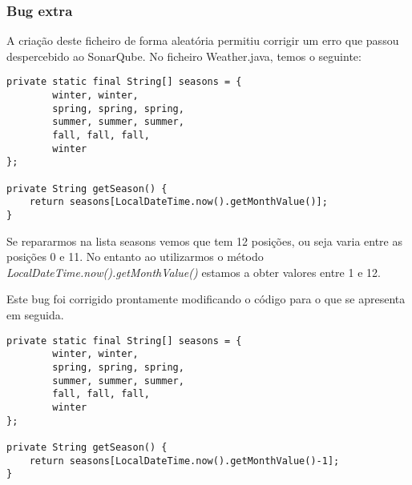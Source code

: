 \subsubsection{Bug extra}\hfill
\newline
\par A criação deste ficheiro de forma aleatória permitiu corrigir um erro que passou despercebido ao SonarQube. No ficheiro Weather.java, temos o seguinte:\newline
\hfill\newline

\begin{lstlisting}
private static final String[] seasons = {
        winter, winter,
        spring, spring, spring,
        summer, summer, summer,
        fall, fall, fall,
        winter
};

private String getSeason() {
    return seasons[LocalDateTime.now().getMonthValue()];
}
\end{lstlisting}
\hfill\newline
\par Se repararmos na lista seasons vemos que tem 12 posições, ou seja varia entre as posições 0 e 11.
No entanto ao utilizarmos o método \textit{LocalDateTime.now().getMonthValue()} estamos a obter valores entre 1 e 12.\newline
\par Este bug foi corrigido prontamente modificando o código para o que se apresenta em seguida.\newline
\hfill\newline
\begin{lstlisting}
private static final String[] seasons = {
        winter, winter,
        spring, spring, spring,
        summer, summer, summer,
        fall, fall, fall,
        winter
};

private String getSeason() {
    return seasons[LocalDateTime.now().getMonthValue()-1];
}
\end{lstlisting}
\hfill\newline
\newpage







